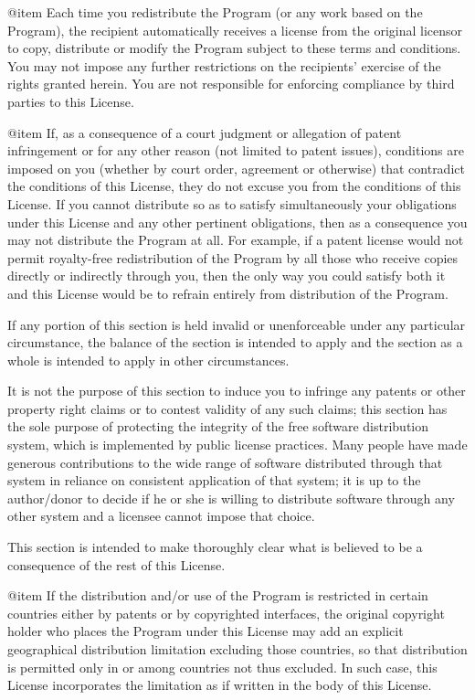 @item
Each time you redistribute the Program (or any work based on the
Program), the recipient automatically receives a license from the
original licensor to copy, distribute or modify the Program subject to
these terms and conditions.  You may not impose any further
restrictions on the recipients' exercise of the rights granted herein.
You are not responsible for enforcing compliance by third parties to
this License.

@item
If, as a consequence of a court judgment or allegation of patent
infringement or for any other reason (not limited to patent issues),
conditions are imposed on you (whether by court order, agreement or
otherwise) that contradict the conditions of this License, they do not
excuse you from the conditions of this License.  If you cannot
distribute so as to satisfy simultaneously your obligations under this
License and any other pertinent obligations, then as a consequence you
may not distribute the Program at all.  For example, if a patent
license would not permit royalty-free redistribution of the Program by
all those who receive copies directly or indirectly through you, then
the only way you could satisfy both it and this License would be to
refrain entirely from distribution of the Program.

If any portion of this section is held invalid or unenforceable under
any particular circumstance, the balance of the section is intended to
apply and the section as a whole is intended to apply in other
circumstances.

It is not the purpose of this section to induce you to infringe any
patents or other property right claims or to contest validity of any
such claims; this section has the sole purpose of protecting the
integrity of the free software distribution system, which is
implemented by public license practices.  Many people have made
generous contributions to the wide range of software distributed
through that system in reliance on consistent application of that
system; it is up to the author/donor to decide if he or she is willing
to distribute software through any other system and a licensee cannot
impose that choice.

This section is intended to make thoroughly clear what is believed to
be a consequence of the rest of this License.

@item
If the distribution and/or use of the Program is restricted in
certain countries either by patents or by copyrighted interfaces, the
original copyright holder who places the Program under this License
may add an explicit geographical distribution limitation excluding
those countries, so that distribution is permitted only in or among
countries not thus excluded.  In such case, this License incorporates
the limitation as if written in the body of this License.

